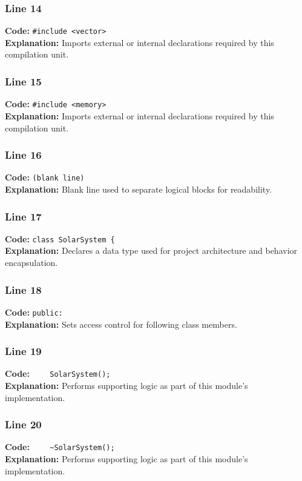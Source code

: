 \documentclass[11pt,a4paper]{article}
\begin{document}
\subsubsection*{Line 14}
\textbf{Code:} \verb|#include <vector>|\\
\textbf{Explanation:} Imports external or internal declarations required by this compilation unit.

\subsubsection*{Line 15}
\textbf{Code:} \verb|#include <memory>|\\
\textbf{Explanation:} Imports external or internal declarations required by this compilation unit.

\subsubsection*{Line 16}
\textbf{Code:} \texttt{(blank line)}\\
\textbf{Explanation:} Blank line used to separate logical blocks for readability.

\subsubsection*{Line 17}
\textbf{Code:} \verb|class SolarSystem {|\\
\textbf{Explanation:} Declares a data type used for project architecture and behavior encapsulation.

\subsubsection*{Line 18}
\textbf{Code:} \verb|public:|\\
\textbf{Explanation:} Sets access control for following class members.

\subsubsection*{Line 19}
\textbf{Code:} \verb|    SolarSystem();|\\
\textbf{Explanation:} Performs supporting logic as part of this module's implementation.

\subsubsection*{Line 20}
\textbf{Code:} \verb|    ~SolarSystem();|\\
\textbf{Explanation:} Performs supporting logic as part of this module's implementation.
\end{document}
